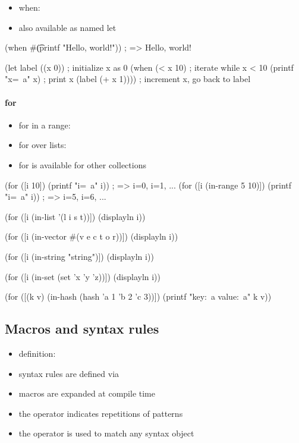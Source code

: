 \documentclass[a4paper,landscape,10pt]{article}
\begin{document}
\begin{multicols*}{2}
  \begin{itemize}
    \item when: 
    \item also available as named let
  \end{itemize}

  \begin{racket}
(when #\t (printf "Hello, world!\n")) ; => Hello, world!

(let label ((x 0))      ; initialize x as 0
  (when (< x 10)        ; iterate while x < 10
    (printf "x=~a\n" x) ; print x
    (label (+ x 1))))   ; increment x, go back to label
  \end{racket}

  \paragraph{for}

  \begin{itemize}
    \item for in a range: 
    \item for over lists: 
    \item for is available for other collections
  \end{itemize}

  \begin{racket}
(for ([i 10])
  (printf "i=~a\n" i)) ; => i=0, i=1, ...
(for ([i (in-range 5 10)])
  (printf "i=~a\n" i)) ; => i=5, i=6, ...

(for ([i (in-list '(l i s t))])
  (displayln i))

(for ([i (in-vector #(v e c t o r))])
  (displayln i))

(for ([i (in-string "string")])
  (displayln i))

(for ([i (in-set (set 'x 'y 'z))])
  (displayln i))

(for ([(k v) (in-hash (hash 'a 1 'b 2 'c 3))])
  (printf "key:~a value:~a\n" k v))
  \end{racket}

  \breakcolumn

  \subsection{Macros and syntax rules}

  \begin{itemize}
    \item definition: 
    \item syntax rules are defined via 
    \item macros are expanded at compile time
    \item the  operator indicates repetitions of patterns
    \item the \iracket{_} operator is used to match any syntax object
  \end{itemize}


\end{multicols*}
\end{document}
